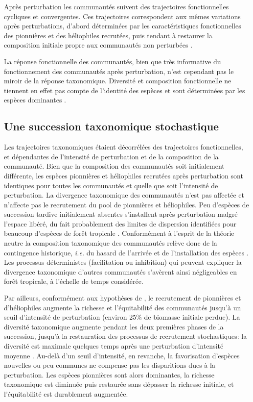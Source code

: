 \documentclass[
  11pt,
  french,
  A4paper,
  extrafontsizes,onecolumn,openright
  ]{memoir}
\begin{document}
Après perturbation les communautés suivent des trajectoires
fonctionnelles cycliques et convergentes. Ces trajectoires correspondent
aux mêmes variations après perturbations, d'abord déterminées par les
caractéristiques fonctionnelles des pionnières et des héliophiles
recrutées, puis tendant à restaurer la composition initiale propre aux
communautés non perturbées \autocite{Buzzard2016}.

La réponse fonctionnelle des communautés, bien que très informative du
fonctionnement des communautés après perturbation, n'est cependant pas
le miroir de la réponse taxonomique. Diversité et composition
fonctionnelle ne tiennent en effet pas compte de l'identité des espèces
et sont déterminées par les espèces dominantes
\autocites{Grime1998}{Lavorel2002}.

\subsection{Une succession taxonomique
stochastique}\label{une-succession-taxonomique-stochastique}

Les trajectoires taxonomiques étaient décorrélées des trajectoires
fonctionnelles, et dépendantes de l'intensité de perturbation et de la
composition de la communauté. Bien que la composition des communautés
soit initialement différente, les espèces pionnières et héliophiles
recrutées après perturbation sont identiques pour toutes les communautés
et quelle que soit l'intensité de perturbation. La divergence
taxonomique des communautés n'est pas affectée et n'affecte pas le
recrutement du pool de pionnières et héliophiles. Peu d'espèces de
succession tardive initialement absentes s'installent après perturbation
malgré l'espace libéré, du fait probablement des limites de dispersion
identifiées pour beaucoup d'espèces de forêt tropicale
\autocite{Svenning2005}. Conformément à l'esprit de la théorie neutre la
composition taxonomique des communautés relève donc de la contingence
historique, \emph{i.e.} du hasard de l'arrivée et de l'installation des
espèces \autocite{Hubbell2001}. Les processus déterministes
(facilitation ou inhibition) qui peuvent expliquer la divergence
taxonomique d'autres communautés \autocite{Fukami2005} s'avèrent ainsi
négligeables en forêt tropicale, à l'échelle de temps considérée.

Par ailleurs, conformément aux hypothèses de \textcite{Connell1978}, le
recrutement de pionnières et d'héliophiles augmente la richesse et
l'équitabilité des communautés jusqu'à un seuil d'intensité de
perturbation (environ 25\% de biomasse initiale perdue). La diversité
taxonomique augmente pendant les deux premières phases de la succession,
jusqu'à la restauration des processus de recrutement stochastiques: la
diversité est maximale quelques temps après une perturbation d'intensité
moyenne \autocites{Molino2001}{Guitet2018}. Au-delà d'un seuil
d'intensité, en revanche, la favorisation d'espèces nouvelles ou peu
communes ne compense pas les disparitions dues à la perturbation. Les
espèces pionnières sont alors dominantes, la richesse taxonomique est
diminuée puis restaurée sans dépasser la richesse initiale, et
l'équitabilité est durablement augmentée.
\end{document}
